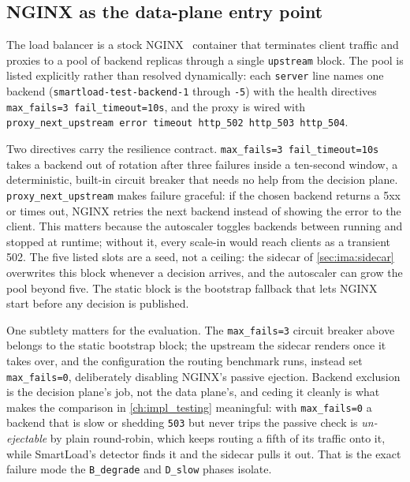 \subsection{NGINX as the data-plane entry point}
\label{sec:ima:nginx}

The load balancer is a stock NGINX~\cite{nginx} container that terminates client
traffic and proxies to a pool of backend replicas through a single
\texttt{upstream} block. The pool is listed explicitly rather than resolved
dynamically: each \texttt{server} line names one backend
(\texttt{smartload-test-backend-1} through \texttt{-5}) with the health directives
\texttt{max\_fails=3 fail\_timeout=10s}, and the proxy is wired with
\texttt{proxy\_next\_upstream error timeout http\_502 http\_503 http\_504}.

Two directives carry the resilience contract. \texttt{max\_fails=3
fail\_timeout=10s} takes a backend out of rotation after three failures inside a
ten-second window, a deterministic, built-in circuit breaker that needs no help
from the decision plane. \texttt{proxy\_next\_upstream} makes failure graceful: if
the chosen backend returns a 5xx or times out, NGINX retries the next backend
instead of showing the error to the client. This matters because the autoscaler
toggles backends between running and stopped at runtime; without it, every scale-in
would reach clients as a transient 502. The five listed slots are a seed, not a
ceiling: the sidecar of \cref{sec:ima:sidecar} overwrites this block whenever a
decision arrives, and the autoscaler can grow the pool beyond five. The static
block is the bootstrap fallback that lets NGINX start before any decision is
published.

One subtlety matters for the evaluation. The \texttt{max\_fails=3} circuit breaker
above belongs to the static bootstrap block; the upstream the sidecar renders once it
takes over, and the configuration the routing benchmark runs, instead set
\texttt{max\_fails=0}, deliberately disabling NGINX's passive ejection. Backend
exclusion is the decision plane's job, not the data plane's, and ceding it cleanly is
what makes the comparison in \cref{ch:impl_testing} meaningful: with \texttt{max\_fails=0}
a backend that is slow or shedding \texttt{503} but never trips the passive check is
\emph{un-ejectable} by plain round-robin, which keeps routing a fifth of its traffic
onto it, while SmartLoad's detector finds it and the sidecar pulls it out. That is the
exact failure mode the \texttt{B\_degrade} and \texttt{D\_slow} phases isolate.

